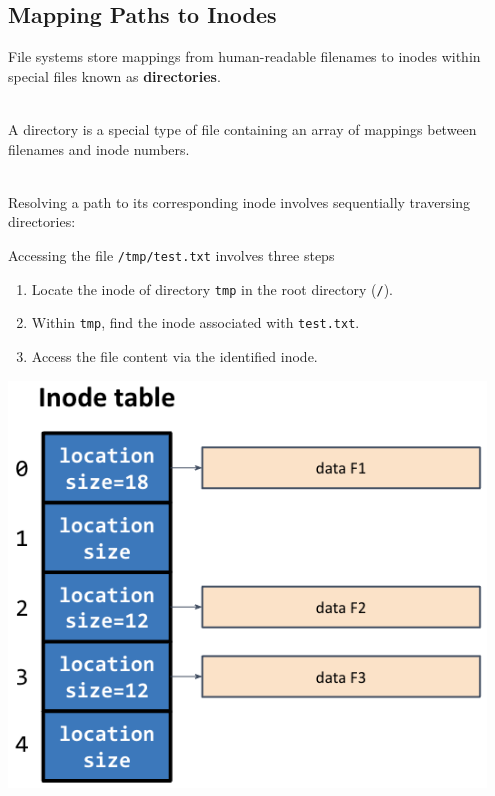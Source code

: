 \documentclass[../../compsys.tex]{subfiles}
\begin{document}
\subsection{Mapping Paths to Inodes}
File systems store mappings from human-readable filenames to inodes within special files known as \textbf{directories}.\\[3px]

\begin{definition}[Directory]\leavevmode \\[5px]
A directory is a special type of file containing an array of mappings between filenames and inode numbers.
\end{definition}


\begin{example}
\leavevmode
\\[5px]
Resolving a path to its corresponding inode involves sequentially traversing directories:\\
\noindent
\begin{minipage}{0.45\textwidth}
Accessing the file \texttt{/tmp/test.txt} involves three steps
\begin{enumerate}
    \item Locate the inode of directory \texttt{tmp} in the root directory (\texttt{/}).
    \item Within \texttt{tmp}, find the inode associated with \texttt{test.txt}.
    \item Access the file content via the identified inode.
\end{enumerate}
\end{minipage}%
\hfill
\vline
\hfill
\begin{minipage}{0.45\textwidth}
\begin{center}
  \includegraphics[width=0.95\textwidth]{chapters/L6/images/inode-table.png}
\end{center}
\end{minipage}
\end{example}
\end{document}
